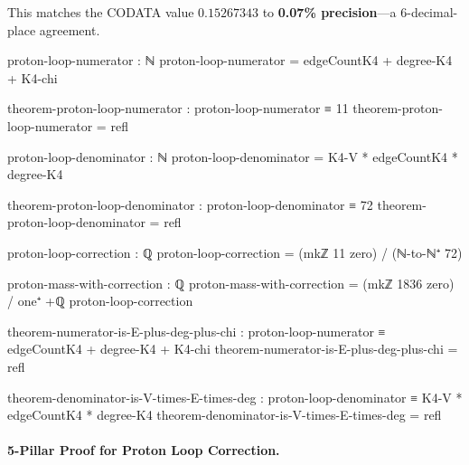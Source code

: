 \documentclass[11pt,a4paper]{book}
\begin{document}
This matches the CODATA value $0.15267343$ to \textbf{0.07\% precision}---a 6-decimal-place agreement.

\begin{code}
proton-loop-numerator : ℕ
proton-loop-numerator = edgeCountK4 + degree-K4 + K4-chi

theorem-proton-loop-numerator : proton-loop-numerator ≡ 11
theorem-proton-loop-numerator = refl

proton-loop-denominator : ℕ
proton-loop-denominator = K4-V * edgeCountK4 * degree-K4

theorem-proton-loop-denominator : proton-loop-denominator ≡ 72
theorem-proton-loop-denominator = refl

proton-loop-correction : ℚ
proton-loop-correction = (mkℤ 11 zero) / (ℕ-to-ℕ⁺ 72)

proton-mass-with-correction : ℚ
proton-mass-with-correction = (mkℤ 1836 zero) / one⁺ +ℚ proton-loop-correction

theorem-numerator-is-E-plus-deg-plus-chi : proton-loop-numerator ≡ edgeCountK4 + degree-K4 + K4-chi
theorem-numerator-is-E-plus-deg-plus-chi = refl

theorem-denominator-is-V-times-E-times-deg : proton-loop-denominator ≡ K4-V * edgeCountK4 * degree-K4
theorem-denominator-is-V-times-E-times-deg = refl
\end{code}

\paragraph{5-Pillar Proof for Proton Loop Correction.}
\end{document}
